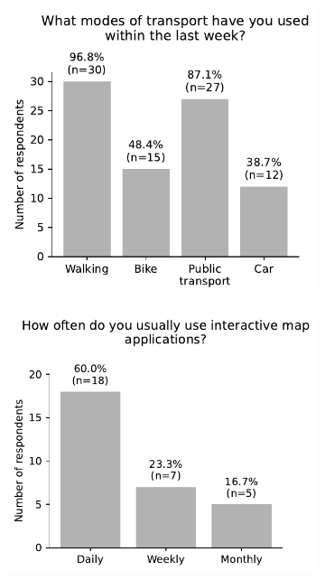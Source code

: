 \begin{appendices}
\begin{minipage}{\textwidth}
\begin{figure}[H]
	\newline
	\begin{subfigure}[b]{0.5\textwidth}  %
		\includegraphics[width=\textwidth]{visual/figures/survey/modes.pdf}
	\end{subfigure}%
	\begin{subfigure}[b]{0.5\textwidth}
		\includegraphics[width=\textwidth]{visual/figures/survey/12.pdf}
	\end{subfigure}%
\end{figure}
\end{minipage}


\end{appendices}
